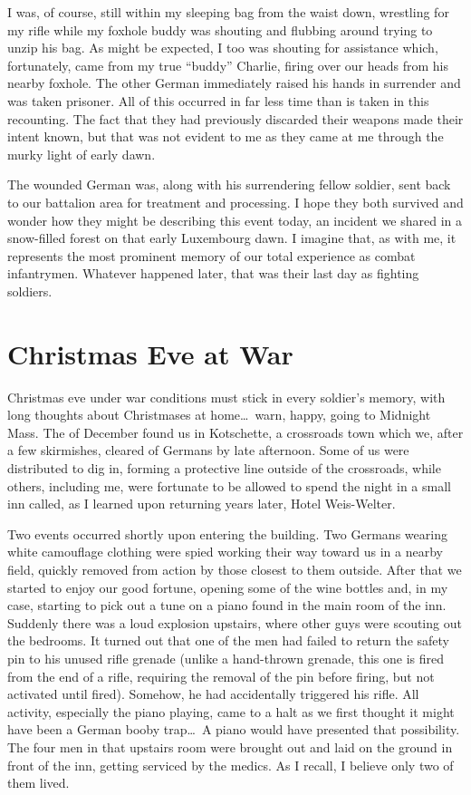 \documentclass[../m3y]{subfiles}
\begin{document}
I was, of course, still within my sleeping bag from the waist down, wrestling for my rifle while my foxhole buddy was shouting and flubbing around trying to unzip his bag. As might be expected, I too was shouting for assistance which, fortunately, came from my true ``buddy'' Charlie, firing over our heads from his nearby foxhole. The other German immediately raised his hands in surrender and was taken prisoner. All of this occurred in far less time than is taken in this recounting. The fact that they had previously discarded their weapons made their intent known, but that was not evident to me as they came at me through the murky light of early dawn.

The wounded German was, along with his surrendering fellow soldier, sent back to our battalion area for treatment and processing. I hope they both survived and wonder how they might be describing this event today, an incident we shared in a snow-filled forest on that early Luxembourg dawn. I imagine that, as with me, it represents the most prominent memory of our total experience as combat infantrymen. Whatever happened later, that was their last day as fighting soldiers.

\section{Christmas Eve at War}
Christmas eve under war conditions must stick in every soldier's memory, with long thoughts about Christmases at home\ldots\ warn, happy, going to Midnight Mass. The  of December found us in Kotschette, a crossroads town which we, after a few skirmishes, cleared of Germans by late afternoon. Some of us were distributed to dig in, forming a protective line outside of the crossroads, while others, including me, were fortunate to be allowed to spend the night in a small inn called, as I learned upon returning years later, Hotel Weis-Welter.

Two events occurred shortly upon entering the building. Two Germans wearing white camouflage clothing were spied working their way toward us in a nearby field, quickly removed from action by those closest to them outside. After that we started to enjoy our good fortune, opening some of the wine bottles and, in my case, starting to pick out a tune on a piano found in the main room of the inn. Suddenly there was a loud explosion upstairs, where other guys were scouting out the bedrooms. It turned out that one of the men had failed to return the safety pin to his unused rifle grenade (unlike a hand-thrown grenade, this one is fired from the end of a rifle, requiring the removal of the pin before firing, but not activated until fired). Somehow, he had accidentally triggered his rifle. All activity, especially the piano playing, came to a halt as we first thought it might have been a German booby trap\ldots\ A piano would have presented that possibility. The four men in that upstairs room were brought out and laid on the ground in front of the inn, getting serviced by the medics. As I recall, I believe only two of them lived.
\end{document}
